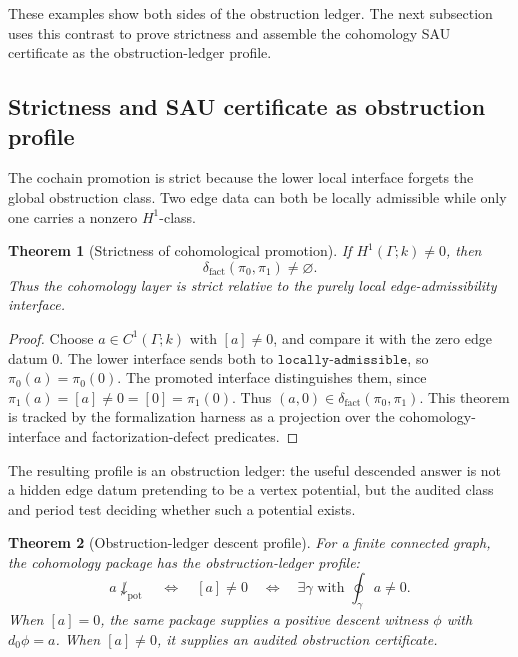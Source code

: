 \documentclass[11pt]{article}
\newtheorem{theorem}{Theorem}[section]
\theoremstyle{definition}
\begin{document}
These examples show both sides of the obstruction ledger.  The next subsection
uses this contrast to prove strictness and assemble the cohomology SAU
certificate as the obstruction-ledger profile.

\subsection{Strictness and SAU certificate as obstruction profile}
\label{subsec:coh-strictness-certificate}

The cochain promotion is strict because the lower local interface forgets the
global obstruction class.  Two edge data can both be locally admissible while
only one carries a nonzero \(H^1\)-class.

\begin{theorem}[Strictness of cohomological promotion]
\label{thm:coh-strictness}
If \(H^1(\Gamma;k)\neq0\), then
\[
\delta_{\mathrm{fact}}(\pi_0,\pi_1)\neq\varnothing.
\]
Thus the cohomology layer is strict relative to the purely local edge-admissibility interface.
\end{theorem}

\begin{proof}
Choose \(a\in C^1(\Gamma;k)\) with \([a]\neq0\), and compare it with the zero
edge datum \(0\).  The lower interface sends both to
\(\texttt{locally-admissible}\), so \(\pi_0(a)=\pi_0(0)\).  The promoted
interface distinguishes them, since \(\pi_1(a)=[a]\neq0=[0]=\pi_1(0)\).  Thus
\((a,0)\in\delta_{\mathrm{fact}}(\pi_0,\pi_1)\).  This theorem is tracked by the
formalization harness as a projection over the cohomology-interface and
factorization-defect predicates.
\end{proof}

The resulting profile is an obstruction ledger: the useful descended answer is
not a hidden edge datum pretending to be a vertex potential, but the audited
class and period test deciding whether such a potential exists.

\begin{theorem}[Obstruction-ledger descent profile]
\label{thm:coh-obstruction-profile}
For a finite connected graph, the cohomology package has the obstruction-ledger profile:
\[
a\not\downarrow_{\mathrm{pot}}
\quad\Longleftrightarrow\quad
[a]\neq0
\quad\Longleftrightarrow\quad
\exists\gamma\text{ with }\oint_\gamma a\neq0.
\]
When \([a]=0\), the same package supplies a positive descent witness \(\phi\) with \(d_0\phi=a\).  When \([a]\neq0\), it supplies an audited obstruction certificate.
\end{theorem}
\end{document}
